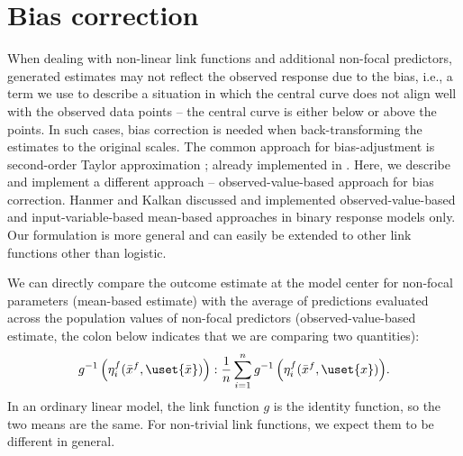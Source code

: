 
\section{Bias correction}

When dealing with non-linear link functions and additional non-focal predictors,  generated estimates may not reflect the observed response due to the bias, i.e., a term we use to describe a situation in which the central curve does not align well with the observed data points -- the central curve is either below or above the points. In such cases, bias correction is needed when back-transforming the estimates to the original scales. The common approach for bias-adjustment is second-order Taylor approximation \citep{duursma2003bias, hanmer2013behind}; already implemented in  \citep{lenth2018package}. Here, we describe and implement a different approach -- observed-value-based approach for bias correction. Hanmer and Kalkan \citep{hanmer2013behind} discussed and implemented observed-value-based and input-variable-based mean-based approaches in binary response models only. Our formulation is more general and can easily be extended to other link functions other than logistic. 


We can directly compare the outcome estimate at the model center for non-focal parameters (mean-based estimate) with the average of predictions evaluated across the population values of non-focal predictors (observed-value-based estimate, the colon below indicates that we are comparing two quantities):
%
\begin{align}\label{eq:compare_anchored_pop_based}
g^{-1} \left(\eta_i^f(\bar{x}^f, \uset{\bar{x}})\right) : \frac{1}{n} \sum_{i=1}^n{ g^{-1} \left(\eta_i^f(\bar{x}^f, \uset{x})\right)}.
\end{align}
%
In an ordinary linear model, the link function $g$ is the identity function, so the two means are the same. For non-trivial link functions, we expect them to be different in general.

